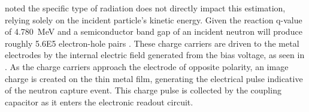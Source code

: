 \documentclass[../../../../main.tex]{subfiles}
\begin{document}
    \citeauthor*{Klein_1968} noted the specific type of radiation does not directly impact this estimation, relying solely on the incident particle's kinetic energy.
    Given the reaction \gls{q-value} of \SI{4.780}{\mega\electronvolt} and a semiconductor band gap of  an incident neutron will produce roughly \num{5.6E5} electron-hole pairs \cite{Tupitsyn_2012}.
    These charge carriers are driven to the metal electrodes by the internal electric field generated from the bias voltage, as seen in .
    As the charge carriers approach the electrode of opposite polarity, an image charge is created on the thin metal film, generating the electrical pulse indicative of the neutron capture event.
    This charge pulse is collected by the coupling capacitor as it enters the electronic readout circuit.
\end{document}
